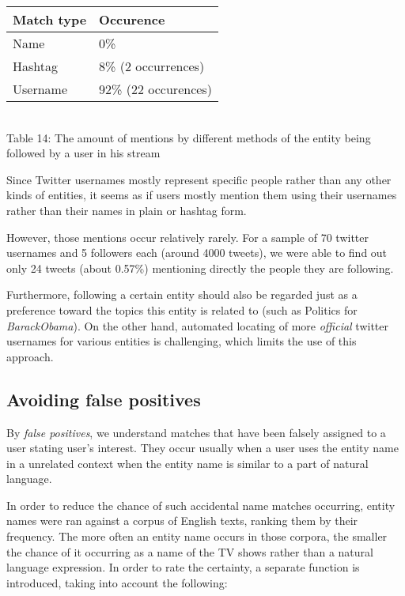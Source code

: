 \begin{center}
  \begin{tabular}{ | p{3cm}| p{2cm} | } \hline
    Match type & Occurence \\ \hline
    Name & 0\% \\ \hline
    Hashtag & 8\% (2 occurrences) \\ \hline
    Username & 92\% (22 occurences) \\ \hline
  \end{tabular} \\
  Table 14: The amount of mentions by different methods of the entity being followed by a user in his stream \\
\end{center}

Since Twitter usernames mostly represent specific people rather than any other kinds of entities, it seems as if users mostly
mention them using their usernames rather than their names in plain or hashtag form.

However, those mentions occur relatively rarely. For a sample of 70 twitter usernames and 5 followers each
(around 4000 tweets), we were able to find out only 24 tweets (about 0.57\%) mentioning directly the people they are following.

Furthermore, following a certain entity should also be regarded just as a preference toward the topics this entity is related to (such as Politics for \textit{BarackObama}). On the other hand, automated locating of more \textit{official} twitter usernames for various entities is challenging, which
limits the use of this approach.

\subsection{Avoiding false positives}
By \textit{false positives}, we understand matches that have been falsely assigned to a user stating user's interest.
They occur usually when a user uses the entity name in a unrelated context when the entity name is similar to a
part of natural language.

In order to reduce the chance of such accidental name matches occurring, entity names were ran against a corpus
of English texts, ranking them by their frequency. The more often an entity name occurs in those corpora, the smaller the chance of it occurring as a name of the TV shows rather than a natural language expression. In order to rate the certainty, a separate function is introduced, taking into account the following:

